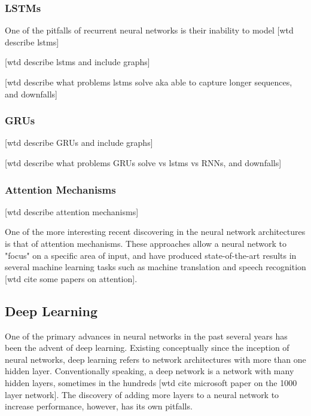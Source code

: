 \documentclass[a4paper,11pt,twoside]{scrbook}
\begin{document}
\subsubsection{LSTMs}

One of the pitfalls of recurrent neural networks is their inability to model [wtd describe lstms]

[wtd describe lstms and include graphs]

[wtd describe what problems lstms solve aka able to capture longer sequences, and downfalls]

\subsubsection{GRUs}

[wtd describe GRUs and include graphs]

[wtd describe what problems GRUs solve vs lstms vs RNNs, and downfalls]

\subsubsection{Attention Mechanisms}

[wtd describe attention mechanisms]

One of the more interesting recent discovering in the neural network architectures is that of attention mechanisms.  These approaches allow a neural network to "focus" on a specific area of input, and have produced state-of-the-art results in several machine learning tasks such as machine translation and speech recognition [wtd cite some papers on attention].

\subsection{Deep Learning}

One of the primary advances in neural networks in the past several years has been the advent of deep learning.  Existing conceptually since the inception of neural networks, deep learning refers to network architectures with more than one hidden layer.  Conventionally speaking, a deep network is a network with many hidden layers, sometimes in the hundreds [wtd cite microsoft paper on the 1000 layer network].  The discovery of adding more layers to a neural network to increase performance, however, has its own pitfalls.  
\end{document}
